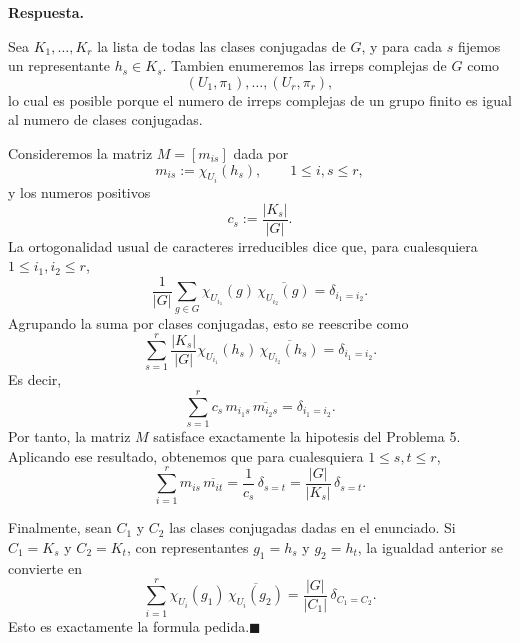 \documentclass[10pt,a4paper]{article}
\newcommand{\inlinehead}[2][repblue]{%
  \par\smallskip
  {\color{#1}\bfseries #2.}\hspace{0.45em}%
}
\newcommand{\answer}{\inlinehead{Respuesta}}
\begin{document}
\answer
Sea $K_1,\dots,K_r$ la lista de todas las clases conjugadas de $G$, y para
cada $s$ fijemos un representante $h_s\in K_s$. Tambien enumeremos las irreps
complejas de $G$ como
\[
  (U_1,\pi_1),\dots,(U_r,\pi_r),
\]
lo cual es posible porque el numero de irreps complejas de un grupo finito es
igual al numero de clases conjugadas.

Consideremos la matriz $M=[m_{is}]$ dada por
\[
  m_{is}:=\chi_{U_i}(h_s),
  \qquad 1\le i,s\le r,
\]
y los numeros positivos
\[
  c_s:=\frac{|K_s|}{|G|}.
\]
La ortogonalidad usual de caracteres irreducibles dice que, para cualesquiera
$1\le i_1,i_2\le r$,
\[
  \frac{1}{|G|}\sum_{g\in G}
  \chi_{U_{i_1}}(g)\,\overline{\chi_{U_{i_2}}(g)}
  =\delta_{i_1=i_2}.
\]
Agrupando la suma por clases conjugadas, esto se reescribe como
\[
  \sum_{s=1}^r \frac{|K_s|}{|G|}
  \chi_{U_{i_1}}(h_s)\,\overline{\chi_{U_{i_2}}(h_s)}
  =\delta_{i_1=i_2}.
\]
Es decir,
\[
  \sum_{s=1}^r c_s\,m_{i_1s}\,\overline{m_{i_2s}}
  =\delta_{i_1=i_2}.
\]
Por tanto, la matriz $M$ satisface exactamente la hipotesis del Problema 5.
Aplicando ese resultado, obtenemos que para cualesquiera $1\le s,t\le r$,
\[
  \sum_{i=1}^r m_{is}\,\overline{m_{it}}
  =\frac{1}{c_s}\,\delta_{s=t}
  =\frac{|G|}{|K_s|}\,\delta_{s=t}.
\]

Finalmente, sean $C_1$ y $C_2$ las clases conjugadas dadas en el enunciado. Si
$C_1=K_s$ y $C_2=K_t$, con representantes $g_1=h_s$ y $g_2=h_t$, la igualdad
anterior se convierte en
\[
  \sum_{i=1}^r \chi_{U_i}(g_1)\,\overline{\chi_{U_i}(g_2)}
  =\frac{|G|}{|C_1|}\,\delta_{C_1=C_2}.
\]
Esto es exactamente la formula pedida.\hfill$\blacksquare$
\end{document}
